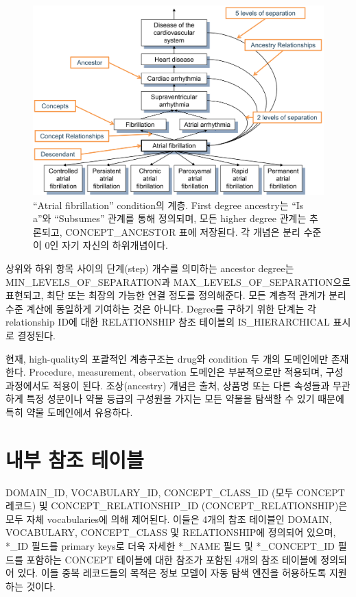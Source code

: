 \documentclass[11pt]{book}
\theoremstyle{definition}
\theoremstyle{definition}
\theoremstyle{definition}
\theoremstyle{remark}
\begin{document}
\begin{figure}

{\centering \includegraphics[width=1\linewidth]{images/StandardizedVocabularies/conceptAncestor} 

}

\caption{``Atrial fibrillation'' condition의 계층. First degree
ancestry는 ``Is a''와 ``Subsumes'' 관계를 통해 정의되며, 모든 higher
degree 관계는 추론되고, CONCEPT\_ANCESTOR 표에 저장된다. 각 개념은 분리
수준이 0인 자기 자신의 하위개념이다. }\label{fig:conceptAncestor}
\end{figure}

상위와 하위 항목 사이의 단계(step) 개수를 의미하는 ancestor degree는
MIN\_LEVELS\_OF\_SEPARATION과 MAX\_LEVELS\_OF\_SEPARATION으로 표현되고,
최단 또는 최장의 가능한 연결 정도를 정의해준다. 모든 계층적 관계가 분리
수준 계산에 동일하게 기여하는 것은 아니다. Degree를 구하기 위한 단계는
각 relationship ID에 대한 RELATIONSHIP 참조 테이블의 IS\_HIERARCHICAL
표시로 결정된다.

현재, high-quality의 포괄적인 계층구조는 drug와 condition 두 개의
도메인에만 존재한다. Procedure, measurement, observation 도메인은
부분적으로만 적용되며, 구성과정에서도 적용이 된다. 조상(ancestry) 개념은
출처, 상품명 또는 다른 속성들과 무관하게 특정 성분이나 약물 등급의
구성원을 가지는 모든 약물을 탐색할 수 있기 때문에 특히 약물 도메인에서
유용하다.

\section{내부 참조 테이블}\label{--}

DOMAIN\_ID, VOCABULARY\_ID, CONCEPT\_CLASS\_ID (모두 CONCEPT 레코드) 및
CONCEPT\_RELATIONSHIP\_ID (CONCEPT\_RELATIONSHIP)은 모두 자체
vocabularies에 의해 제어된다. 이들은 4개의 참조 테이블인 DOMAIN,
VOCABULARY, CONCEPT\_CLASS 및 RELATIONSHIP에 정의되어 있으며, *\_ID
필드를 primary keys로 더욱 자세한 *\_NAME 필드 및 *\_CONCEPT\_ID 필드를
포함하는 CONCEPT 테이블에 대한 참조가 포함된 4개의 참조 테이블에
정의되어 있다. 이들 중복 레코드들의 목적은 정보 모델이 자동 탐색 엔진을
허용하도록 지원하는 것이다.
\end{document}
